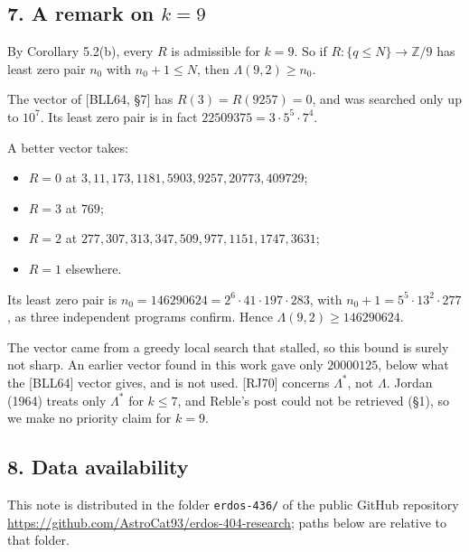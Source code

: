 \documentclass[
]{amsart}
\providecommand{\tightlist}{%
  \setlength{\itemsep}{0pt}\setlength{\parskip}{0pt}}
\begin{document}
\hypertarget{a-remark-on-k9}{%
\subsection{\texorpdfstring{7. A remark on
\(k=9\)}{7. A remark on k=9}}\label{a-remark-on-k9}}

By Corollary 5.2(b), every \(R\) is admissible for \(k=9\). So if
\(R:\{q\le N\}\to\mathbb{Z}/9\) has least zero pair \(n_0\) with
\(n_0+1\le N\), then \(\Lambda(9,2)\ge n_0\).

The vector of {[}BLL64, §7{]} has \(R(3)=R(9257)=0\), and was searched
only up to \(10^7\). Its least zero pair is in fact
\(22509375=3\cdot5^5\cdot7^4\).

A better vector takes:

\begin{itemize}
\tightlist
\item
  \(R=0\) at \(3,11,173,1181,5903,9257,20773,409729\);
\item
  \(R=3\) at \(769\);
\item
  \(R=2\) at \(277,307,313,347,509,977,1151,1747,3631\);
\item
  \(R=1\) elsewhere.
\end{itemize}

Its least zero pair is \(n_0=146290624=2^6\cdot41\cdot197\cdot283\),
with \(n_0+1=5^5\cdot13^2\cdot277\), as three independent programs
confirm. Hence \(\Lambda(9,2)\ge146290624\).

The vector came from a greedy local search that stalled, so this bound
is surely not sharp. An earlier vector found in this work gave only
\(20000125\), below what the {[}BLL64{]} vector gives, and is not used.
{[}RJ70{]} concerns \(\Lambda^*\), not \(\Lambda\). Jordan (1964) treats
only \(\Lambda^*\) for \(k\le7\), and Reble's post could not be
retrieved (§1), so we make no priority claim for \(k=9\).

\hypertarget{data-availability}{%
\subsection{8. Data availability}\label{data-availability}}

This note is distributed in the folder \texttt{erdos-436/} of the public
GitHub repository
\url{https://github.com/AstroCat93/erdos-404-research}; paths below are
relative to that folder.
\end{document}
